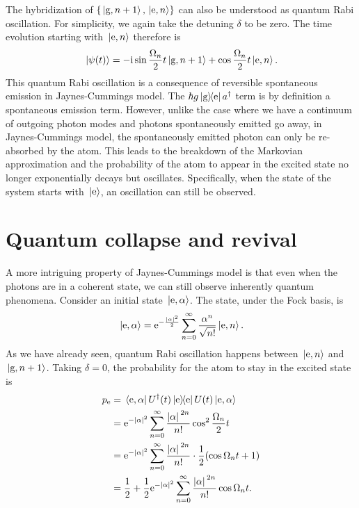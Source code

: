 \documentclass[hyperref, a4paper]{article}
\newcommand*{\ii}{\mathrm{i}}
\newcommand*{\ee}{\mathrm{e}}
\newcommand*{\kete}{\ket*{\text{e}}}
\newcommand*{\dyadge}{\dyad{\text{g}}{\text{e}}}
\newcommand*{\pope}{p_{\text{e}}}
\newcommand*{\statee}{\text{e}}
\newcommand*{\stateg}{\text{g}}
\begin{document}
The hybridization of $\{\ket*{\stateg, n+1}, \ket*{\statee, n}\}$
can also be understood as quantum Rabi oscillation.
For simplicity, we again take the detuning $\delta$ to be zero.
The time evolution starting with $\ket*{\statee, n}$ therefore is 
\begin{equation}
    \ket*{\psi(t)} = - \ii \sin \frac{\Omega_n}{2} t \ket*{\stateg, n+1}  
    + \cos \frac{\Omega_n}{2} t \ket*{\statee, n}.
\end{equation}
This quantum Rabi oscillation is a consequence of reversible spontaneous emission in Jaynes-Cummings model.
The $\hbar g \dyadge a^\dag$ term is by definition a spontaneous emission term.
However, unlike the case where we have a continuum of outgoing photon modes 
and photons spontaneously emitted go away,
in Jaynes-Cummings model, the spontaneously emitted photon can only be re-absorbed by the atom.
This leads to the breakdown of the Markovian approximation
and the probability of the atom to appear in the excited state no longer exponentially decays but oscillates.
Specifically, when the state of the system starts with $\kete$,
an oscillation can still be observed.

\section{Quantum collapse and revival}\label{sec:collapse-revival}

A more intriguing property of Jaynes-Cummings model is that
even when the photons are in a coherent state,
we can still observe inherently quantum phenomena.
Consider an initial state $\ket*{\statee, \alpha}$.
The state, under the Fock basis, is
\begin{equation}
    \ket*{\statee, \alpha} = \ee^{- \frac{\abs*{\alpha}^2}{2}} 
    \sum_{n=0}^{\infty} \frac{\alpha^n}{\sqrt{n!}} \ket*{\text{e}, n}.
\end{equation}
As we have already seen, quantum Rabi oscillation happens between $\ket*{\statee, n}$ and $\ket*{\stateg, n+1}$.
Taking $\delta=0$, the probability for the atom to stay in the excited state is
\begin{equation}
    \begin{aligned}
        \pope &= \bra*{\statee, \alpha} U^\dag(t) \dyad{\statee} U(t) \ket*{\statee, \alpha} \\
        &= \ee^{-\abs{\alpha}^2} \sum_{n=0}^{\infty} \frac{\abs*{\alpha}^{2n}}{n!} \cos^2 \frac{\Omega_n}{2} t \\
        &= \ee^{-\abs{\alpha}^2} \sum_{n=0}^{\infty} \frac{\abs*{\alpha}^{2n}}{n!} \cdot \frac{1}{2} (\cos \Omega_n t + 1) \\
        &= \frac{1}{2} + \frac{1}{2} \ee^{-\abs{\alpha}^2} \sum_{n=0}^{\infty} \frac{\abs*{\alpha}^{2n}}{n!} \cos \Omega_n t .
    \end{aligned}
    \label{eq:pope-fock-expansion}
\end{equation}
\end{document}
